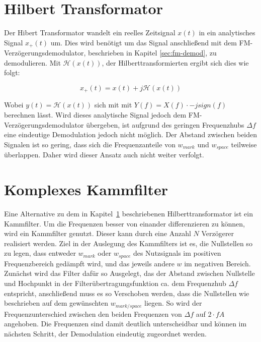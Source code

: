 \documentclass{article}
\begin{document}
%    
%

\section{Hilbert Transformator}\label{sec:hilbert}
Der Hibert Transformator wandelt ein reelles Zeitsignal $x(t)$ in ein analytisches Signal $x_+(t)$ um.
Dies wird benötigt um das Signal anschließend mit dem FM-Verzögerungsdemodulator, beschrieben in Kapitel \ref{sec:fm-demod}, zu demodulieren.
Mit $\mathcal{H}(x(t))$, der Hilberttransformierten ergibt sich dies wie folgt:

$$ 
x_+(t) = x(t) + j \mathcal{H}(x(t))
$$

Wobei $y(t) = \mathcal{H}(x(t))$ sich mit mit $Y(f) = X(f) \cdot -j sign(f)$ berechnen lässt.
Wird dieses analytische Signal jedoch dem FM-Verzögerungsdemodulator übergeben, ist aufgrund des 
geringen Frequenzhubs $\varDelta f$ eine eindeutige Demodulation jedoch nicht möglich. Der Abstand zwischen beiden Signalen ist so gering, dass sich die 
Frequenzanteile von $w_{mark}$ und $w_{space}$ teilweise überlappen. Daher wird
dieser Ansatz auch nicht weiter verfolgt.


\section{Komplexes Kammfilter}\label{sec:comb}
Eine Alternative zu dem in Kapitel~\ref{sec:hilbert} beschriebenen Hilberttransformator ist ein Kammfilter.
Um die Frequenzen besser von einander differenzieren zu können, wird ein Kammfilter genutzt. Dieser kann durch eine Anzahl $N$ Verzögerer realisiert werden.
Ziel in der Auslegung des Kammfilters ist es, die Nullstellen so zu legen, dass entweder $w_{mark}$ oder $w_{space}$ des Nutzsignals im positiven Frequenzbereich
gedämpft wird, und das jeweils andere $w$ im negativen Bereich. Zunächst wird das Filter dafür so Ausgelegt, das der Abstand zwischen
Nullstelle und Hochpunkt in der Filterübertragungsfunktion ca. dem Frequenzhub $\varDelta f$ entspricht, anschließend muss es so Verschoben werden, dass die Nullstellen wie beschrieben auf dem
gewünschten $w_{mark/space}$ liegen.
So wird der Frequenzunterschied zwischen den beiden Frequenzen von $\varDelta f$ auf $2\cdot fA$ angehoben.
Die Frequenzen sind damit deutlich unterscheidbar und können im nächsten Schritt, der Demodulation eindeutig zugeordnet werden. 
\end{document}
